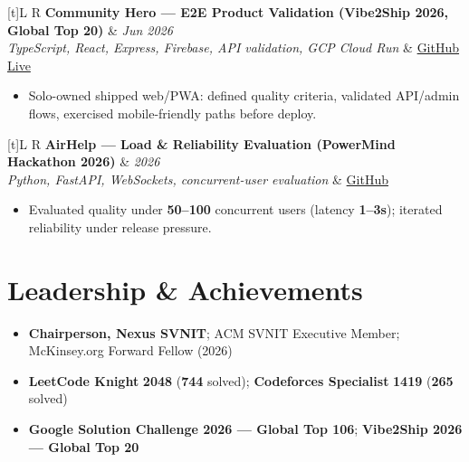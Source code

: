 \documentclass[a4paper,10pt]{article}
\newcommand{\resumeProject}[4]{%
  \vspace{0.3mm}
  \noindent
  \begin{tabularx}{\textwidth}[t]{L R}
    \textbf{#1} & \textit{#3} \\
    \textit{#2} & #4 \\
  \end{tabularx}
  \vspace{-0.3mm}%
}
\begin{document}
\resumeProject
  {Community Hero --- E2E Product Validation (Vibe2Ship 2026, Global Top 20)}
  {TypeScript, React, Express, Firebase, API validation, GCP Cloud Run}
  {Jun 2026}
  {\href{https://github.com/Ojas-Srivastava05/community-hero}{GitHub} \textbar{} \href{https://community-hero-987477089222.asia-south1.run.app}{Live}}
\begin{itemize}
  \item Solo-owned shipped web/PWA: defined quality criteria, validated API/admin flows, exercised mobile-friendly paths before deploy.
\end{itemize}

\resumeProject
  {AirHelp --- Load \& Reliability Evaluation (PowerMind Hackathon 2026)}
  {Python, FastAPI, WebSockets, concurrent-user evaluation}
  {2026}
  {\href{https://github.com/Ojas-Srivastava05/AirHelp-AI-Airport-Assistant}{GitHub}}
\begin{itemize}
  \item Evaluated quality under \textbf{50--100} concurrent users (latency \textbf{1--3s}); iterated reliability under release pressure.
\end{itemize}

\section{Leadership \& Achievements}
\small
\begin{itemize}
  \item \textbf{Chairperson, Nexus SVNIT}; ACM SVNIT Executive Member; McKinsey.org Forward Fellow (2026)
  \item \textbf{LeetCode Knight} \textbf{2048} (\textbf{744} solved); \textbf{Codeforces Specialist} \textbf{1419} (\textbf{265} solved)
  \item \textbf{Google Solution Challenge 2026 --- Global Top 106}; \textbf{Vibe2Ship 2026 --- Global Top 20}
\end{itemize}
\end{document}
